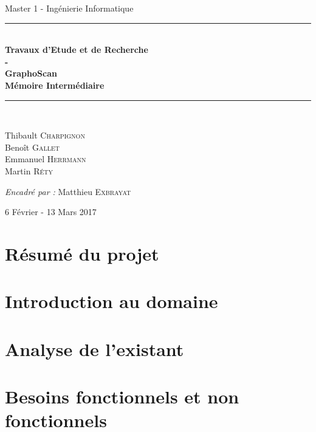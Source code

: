 \documentclass{article}
\begin{document}
\thispagestyle{empty}
\begin{center}
{\large Master 1 - Ingénierie Informatique} \\ [0.5cm]
\vfill
\rule{\linewidth}{0.4mm} \\ [0.4cm]
{\huge \bfseries
Travaux d'Etude et de Recherche\\
- \\
GraphoScan \\ [0.4cm]
Mémoire Intermédiaire \\ [0.4cm]
}
\rule{\linewidth}{0.4mm} \\ [1.5cm]

\begin{minipage}{0.4\textwidth}
\begin{flushleft} \large
Thibault \textsc{Charpignon} \\
Benoît \textsc{Gallet} \\
Emmanuel \textsc{Herrmann} \\
Martin \textsc{Réty}
\end{flushleft}
\end{minipage}

\vfill

\large\emph{Encadré par : }{Matthieu \textsc{Exbrayat}}

\vfill


{\large 6 Février - 13 Mars 2017}

\end{center}

\newpage
\setcounter{page}{1}
\tableofcontents

\newpage

\section{Résumé du projet}



\section{Introduction au domaine}



\section{Analyse de l'existant}



\section{Besoins fonctionnels et non fonctionnels}
\end{document}
